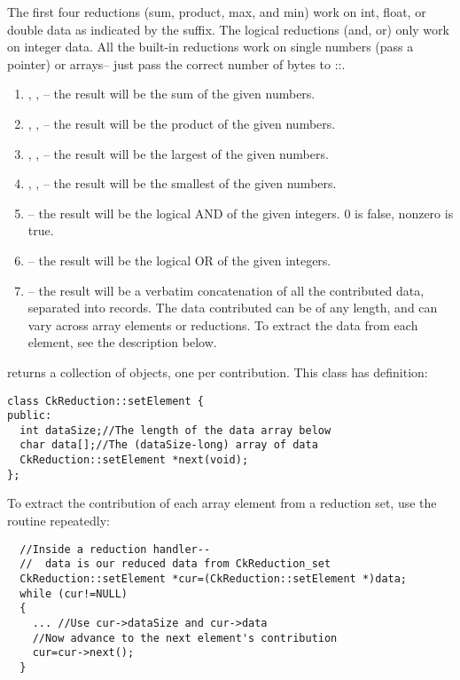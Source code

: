 The first four reductions (sum, product, max, and min) work on int, float, or double data as indicated by the suffix.  The logical reductions (and, or) only work on integer data.  All the built-in reductions work on single numbers (pass a pointer) or arrays-- just pass the correct number of bytes to ::.

\begin{enumerate}
\item {}, , -- the result will be the sum of the given numbers.

\item {}, , -- the result will be the product of the given numbers.

\item {}, , -- the result will be the largest of the given numbers.

\item {}, , -- the result will be the smallest of the given numbers.

\item {}-- the result will be the logical AND of the given integers.  0 is false, nonzero is true.

\item {}-- the result will be the logical OR of the given integers.

\item {}-- the result will be a verbatim concatenation of all the contributed data, separated into  records.  The data contributed can be of any length, and can vary across array elements or reductions.  To extract the data from each element, see the description below.

\end{enumerate}


 returns a collection of  objects, one per contribution.  This class has definition:
\begin{verbatim}
class CkReduction::setElement {
public:
  int dataSize;//The length of the data array below
  char data[];//The (dataSize-long) array of data
  CkReduction::setElement *next(void);
};
\end{verbatim}

To extract the contribution of each array element from a reduction set, use the  routine repeatedly:
\begin{verbatim}
  //Inside a reduction handler-- 
  //  data is our reduced data from CkReduction_set
  CkReduction::setElement *cur=(CkReduction::setElement *)data;
  while (cur!=NULL)
  {
    ... //Use cur->dataSize and cur->data
    //Now advance to the next element's contribution
    cur=cur->next();
  }
\end{verbatim}

